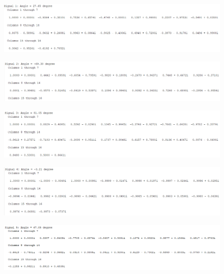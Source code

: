 \begin{figure}[H]
    \centering
    \includegraphics[scale = 0.6]{s1.png}
\end{figure}
\begin{figure}[H]
    \centering
    \includegraphics[scale = 0.6]{s2.png}
\end{figure}
\begin{figure}[H]
    \centering
    \includegraphics[scale = 0.6]{s3.png}
\end{figure}
\begin{figure}[H]
    \centering
    \includegraphics[scale = 0.6]{s4.png}
\end{figure}
\begin{figure}[H]
    \centering
    \includegraphics[scale = 0.6]{s5.png}
\end{figure}